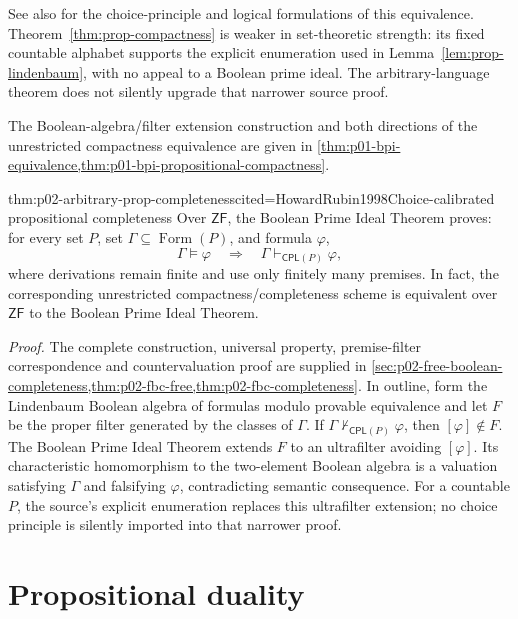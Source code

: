 See also \cite{Jech1973Choice,PaseauLeek2022} for the choice-principle and
logical formulations of this equivalence.  Theorem~\ref{thm:prop-compactness}
is weaker in set-theoretic strength: its fixed countable alphabet supports the
explicit enumeration used in Lemma~\ref{lem:prop-lindenbaum}, with no appeal
to a Boolean prime ideal.  The arbitrary-language theorem does not silently
upgrade that narrower source proof.

The Boolean-algebra/filter extension construction and both directions of
the unrestricted compactness equivalence are given in
\cref{thm:p01-bpi-equivalence,thm:p01-bpi-propositional-compactness}.

\begin{hbtheorem}{thm:p02-arbitrary-prop-completeness}{cited=HowardRubin1998}{Choice-calibrated propositional completeness}
Over \(\mathsf{ZF}\), the Boolean Prime Ideal Theorem proves: for every set
\(P\), set \(\Gamma\subseteq\operatorname{Form}(P)\), and formula \(\varphi\),
\[
 \Gamma\models\varphi\quad\Longrightarrow\quad
 \Gamma\vdash_{\mathsf{CPL}(P)}\varphi,
\]
where derivations remain finite and use only finitely many premises. In fact,
the corresponding unrestricted compactness/completeness scheme is equivalent
over \(\mathsf{ZF}\) to the Boolean Prime Ideal Theorem.
\end{hbtheorem}

\noindent\emph{Proof.}
The complete construction, universal property, premise-filter correspondence
and countervaluation proof are supplied in
\cref{sec:p02-free-boolean-completeness,thm:p02-fbc-free,thm:p02-fbc-completeness}.
In outline, form the Lindenbaum Boolean algebra of formulas modulo provable equivalence and
let \(F\) be the proper filter generated by the classes of \(\Gamma\). If
\(\Gamma\nvdash_{\mathsf{CPL}(P)}\varphi\), then \([\varphi]\notin F\). The Boolean Prime Ideal
Theorem extends \(F\) to an ultrafilter avoiding \([\varphi]\). Its
characteristic homomorphism to the two-element Boolean algebra is a valuation
satisfying \(\Gamma\) and falsifying \(\varphi\), contradicting semantic
consequence. For a countable \(P\), the source's explicit enumeration replaces
this ultrafilter extension; no choice principle is silently imported into that
narrower proof.

\section{Propositional duality}
\label{sec:p02-propositional-duality}

